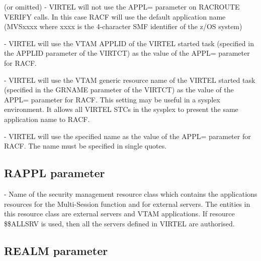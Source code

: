 \documentclass[letterpaper,10pt,english]{sphinxmanual}
\begin{document}
 (or omitted) - VIRTEL will not use the APPL= parameter on RACROUTE VERIFY calls. In this case RACF will use the default application name (MVSxxxx where xxxx is the 4-character SMF identifier of the z/OS system)

 - VIRTEL will use the VTAM APPLID of the VIRTEL started task (specified in the APPLID parameter of the VIRTCT) as the value of the APPL= parameter for RACF.

 - VIRTEL will use the VTAM generic resource name of the VIRTEL started task (specified in the GRNAME parameter of the VIRTCT) as the value of the APPL= parameter for RACF. This setting may be useful in a sysplex environment. It allows all VIRTEL STCs in the sysplex to present the same application name to RACF.

 - VIRTEL will use the specified name as the value of the APPL= parameter for RACF. The name must be specified in single quotes.


\subsection{RAPPL parameter}
\label{\detokenize{Installation_Guide:rappl-parameter}}\label{\detokenize{Installation_Guide:index-104}}
\begin{sphinxVerbatim}[commandchars=\\\{\}]
 
\end{sphinxVerbatim}

 - Name of the security management resource class which contains the applications resources for the Multi-Session function and for external servers. The entities in this resource class are external servers and VTAM applications. If resource \$\$ALLSRV is used, then all the servers defined in VIRTEL are authorised.


\subsection{REALM parameter}
\label{\detokenize{Installation_Guide:realm-parameter}}\label{\detokenize{Installation_Guide:index-105}}
\begin{sphinxVerbatim}[commandchars=\\\{\}]
 
\end{sphinxVerbatim}
\end{document}
